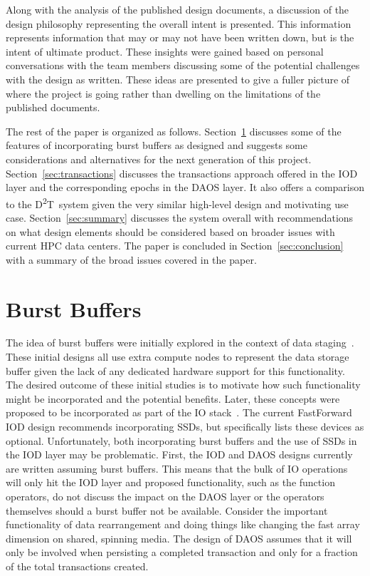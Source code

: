 \documentclass[conference]{IEEEtran}
\newcommand{\DDT}{D\textsuperscript{2}T~}
\begin{document}
Along with the analysis of the published design documents, a discussion of the
design philosophy representing the overall intent is presented. This
information represents information that may or may not have been written down,
but is the intent of ultimate product. These insights were gained based on
personal conversations with the team members discussing some of the potential
challenges with the design as written. These ideas are presented to give a
fuller picture of where the project is going rather than dwelling on the
limitations of the published documents.

The rest of the paper is organized as follows. Section~\ref{sec:burst}
discusses some of the features of incorporating burst buffers as designed and
suggests some considerations and alternatives for the next generation of this
project. Section~\ref{sec:transactions} discusses the transactions approach
offered in the IOD layer and the corresponding epochs in the DAOS layer. It
also offers a comparison to the \DDT system given the very similar high-level
design and motivating use case.  Section~\ref{sec:summary} discusses the system
overall with recommendations on what design elements should be considered based
on broader issues with current HPC data centers. The paper is concluded in
Section~\ref{sec:conclusion} with a summary of the broad issues covered in the
paper.

\section{Burst Buffers}
\label{sec:burst}

The idea of burst buffers were initially explored in the context of data
staging~\cite{abbasi:2007:datatap,Abbasi:2009:datatap,nisar:2008:staging,zheng:2010:predata}.
These initial designs all use extra compute nodes to represent the data storage
buffer given the lack of any dedicated hardware support for this functionality.
The desired outcome of these initial studies is to motivate how such
functionality might be incorporated and the potential benefits.  Later, these
concepts were proposed to be incorporated as part of the IO
stack~\cite{bent:2012:challenges,bent:2012:burst-buffer}.  The current
FastForward IOD design recommends incorporating SSDs, but specifically lists
these devices as optional. Unfortunately, both incorporating burst buffers and
the use of SSDs in the IOD layer may be problematic.  First, the IOD and DAOS
designs currently are written assuming burst buffers. This means that the
bulk of IO operations will only hit the IOD layer and proposed functionality,
such as the function operators, do not discuss the impact on the DAOS layer or
the operators themselves should a burst buffer not be available.  Consider the
important functionality of data rearrangement and doing things like changing
the fast array dimension on shared, spinning media.  The design of DAOS assumes
that it will only be involved when persisting a completed transaction and only
for a fraction of the total transactions created. 
\end{document}
